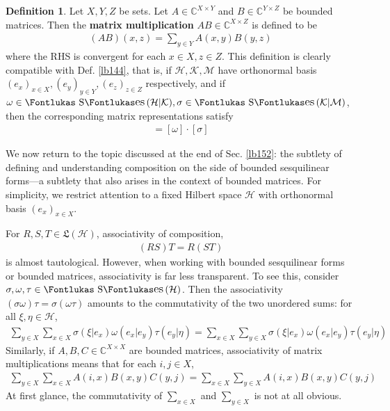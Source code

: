 \documentclass[12pt,b5paper,notitlepage]{article}
\theoremstyle{definition}
\newtheorem{df}{Definition}[section]
\theoremstyle{plain}
\DeclareMathOperator{\Ses}{\text{\Fontlukas S}\text{\kern -0pt {\Fontlukas\large es}}\,}
\newcommand{\fk}{\mathfrak}
\newcommand{\Cbb}{\mathbb C}
\newcommand{\MH}{\mathcal H}
\newcommand{\MK}{\mathcal K}
\newcommand{\MM}{\mathcal M}
\numberwithin{equation}{section}
\begin{document}
\begin{df}
Let $X,Y,Z$ be sets. Let $A\in\Cbb^{X\times Y}$ and $B\in\Cbb^{Y\times Z}$ be bounded matrices. Then the \textbf{matrix multiplication} $AB\in\Cbb^{X\times Z}$  is defined to be
\begin{align*}
(AB)(x,z)=\sum_{y\in Y}A(x,y)B(y,z)
\end{align*}
where the RHS is convergent for each $x\in X,z\in Z$. This definition is clearly compatible with Def. \ref{lb144}, that is, if $\MH,\MK,\MM$ have orthonormal basis $(e_x)_{x\in X},(e_y)_{y\in Y},(e_z)_{z\in Z}$ respectively, and if $\omega\in\Ses(\MH|\MK),\sigma\in\Ses(\MK|\MM)$, then the corresponding matrix representations satisfy
\begin{align*}
[\omega\circ\sigma]=[\omega]\cdot[\sigma]
\end{align*}
\end{df}


We now return to the topic discussed at the end of Sec. \ref{lb152}: the subtlety of defining and understanding composition on the side of bounded sesquilinear forms---a subtlety that also arises in the context of bounded matrices. For simplicity, we restrict attention to a fixed Hilbert space $\MH$ with orthonormal basis $(e_x)_{x\in X}$. 

For $R,S,T\in\fk L(\MH)$, associativity of composition,
\begin{align*}
(RS)T=R(ST)
\end{align*}
is almost tautological. However, when working with bounded sesquilinear forms or bounded matrices, associativity is far less transparent. To see this, consider $\sigma,\omega,\tau\in\Ses(\MH)$. Then the associativity $(\sigma\omega)\tau=\sigma(\omega\tau)$ amounts to the commutativity of the two unordered sums: for all $\xi,\eta\in\MH$,
\begin{align}\label{eq78}
\sum_{y\in X}\sum_{x\in X} \sigma(\xi|e_x)\omega(e_x|e_y)\tau(e_y|\eta)=\sum_{x\in X}\sum_{y\in X}\sigma(\xi|e_x)\omega(e_x|e_y)\tau(e_y|\eta)
\end{align}
Similarly, if $A,B,C\in\Cbb^{X\times X}$ are bounded matrices, associativity of matrix multiplications means that for each $i,j\in X$, 
\begin{align*}
\sum_{y\in X}\sum_{x\in X} A(i,x)B(x,y)C(y,j)=\sum_{x\in X}\sum_{y\in X}A(i,x)B(x,y)C(y,j)
\end{align*}
At first glance, the commutativity of $\sum_{x\in X}$ and $\sum_{y\in X}$ is not at all obvious.
\end{document}
